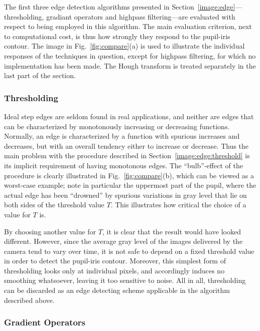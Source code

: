 The first three edge detection algorithms presented in
Section~\ref{image:edge}---thresholding, gradiant operators and
highpass filtering---are evaluated with respect to being employed in
this algorithm.  The main evaluation criterion, next to computational
cost, is thus how strongly they respond to the pupil-iris contour. The
image in Fig.~\ref{fig:compare}(a) is used to illustrate the individual
responses of the techniques in question, except for highpass
filtering, for which no implementation has been made.  The Hough
transform is treated separately in the last part of the section.

\subsubsection{Thresholding}

Ideal step edges are seldom found in real applications, and neither
are edges that can be characterized by monotonously increasing or
decreasing functions.  Normally, an edge is characterized by a
function with spurious increases and decreases, but with an overall
tendency either to increase or decrease.  Thus the main problem with
the procedure described in Section~\ref{image:edge:threshold} is its
implicit requirement of having monotonous edges.  The ``bulb''-effect
of the procedure is clearly illustrated in Fig.~\ref{fig:compare}(b),
which can be viewed as a worst-case example; note in particular the
uppermost part of the pupil, where the actual edge has been
``drowned'' by spurious variations in gray level that lie on both
sides of the threshold value $T$.  This illustrates how critical the
choice of a value for $T$ is.

By choosing another value for $T$, it is clear that the result would
have looked different.  However, since the average gray level of the
images delivered by the camera tend to vary over time, it is not safe
to depend on a fixed threshold value in order to detect the pupil-iris
contour.  Moreover, this simplest form of thresholding looks only at
individual pixels, and accordingly induces no smoothing whatsoever,
leaving it too sensitive to noise.  All in all, thresholding can be
discarded as an edge detecting scheme applicable in the algorithm
described above.

\subsubsection{Gradient Operators}

